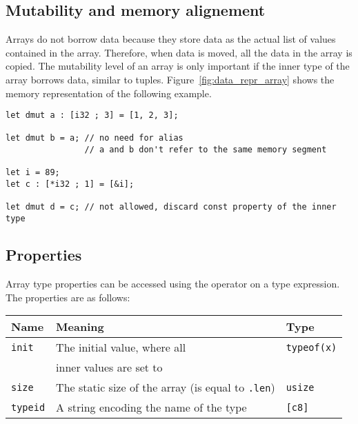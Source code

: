 \subsection {Mutability and memory alignement}
Arrays do not borrow data because they store data as the actual list of values
contained in the array. Therefore, when data is moved, all the data in the array
is copied. The mutability level of an array is only important if the inner type
of the array borrows data, similar to tuples. Figure~\ref{fig:data_repr_array}
shows the memory representation of the following example.

\begin{lstlisting}[style=coloredverbatim]
let dmut a : [i32 ; 3] = [1, 2, 3];

let dmut b = a; // no need for alias
                // a and b don't refer to the same memory segment

let i = 89;
let c : [*i32 ; 1] = [&i];

let dmut d = c; // not allowed, discard const property of the inner type
\end{lstlisting}



\subsection {Properties}

Array type properties can be accessed using the \token{::} operator on a type
expression. The properties are as follows:

\begin{center}\begin{adjustbox}{max width=\linewidth}
  \begin{tabular}{|l|ll|}
    \hline
    Name & Meaning & Type\\
    \hline
    \hline
    \texttt{init} & The initial value, where all & \texttt{typeof(x)} \\
    & inner values are set to  & \\
    \Xhline{0.001pt}
    \texttt{size} & The static size of the array (is equal to \texttt{.len}) & \texttt{usize} \\
    \hline
    \texttt{typeid} & A string encoding the name of the type & \texttt{[c8]} \\
    \hline
  \end{tabular}
\end{adjustbox}\end{center}

